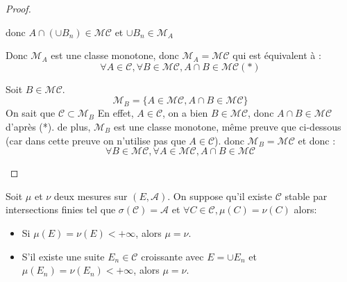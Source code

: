 \begin{proof}
\begin{itemize}
\begin{itemize}
\begin{itemize}
				                  donc $A \cap (\cup B_n) \in \mathscr{M}\mathscr{C}$ et $\cup B_n \in \mathscr{M}_A $
			            \end{itemize}

			            Donc $\mathscr{M}_A$ est une classe monotone, donc $\mathscr{M}_A = \mathscr{M}\mathscr{C}$ qui est équivalent à :
			            $$ \forall A \in \mathscr{C}, \forall B \in \mathscr{M}\mathscr{C}, A \cap B \in \mathscr{M}\mathscr{C} (*)$$

			            Soit $B\in \mathscr{M}\mathscr{C}$.
			            $$ \mathscr{M}_B = \{ A \in \mathscr{M}\mathscr{C}, A \cap B \in \mathscr{M}\mathscr{C}\} $$
			            On sait que $\mathscr{C}\subset\mathscr{M}_B$
			            En effet, $A \in \mathscr{C}$, on a bien $B \in \mathscr{M}\mathscr{C}$, donc $A\cap B \in\mathscr{M}\mathscr{C}$ d'après (*).
			            de plus, $\mathscr{M}_B$ est une classe monotone, même preuve que ci-dessous (car dans cette preuve on n'utilise pas que $A \in \mathscr{C}$).
			            donc $\mathscr{M}_B = \mathscr{M}\mathscr{C}$ et donc :
			            $$ \forall B \in \mathscr{M}\mathscr{C}, \forall A \in \mathscr{M}\mathscr{C}, A \cap B \in \mathscr{M}\mathscr{C}$$
		      \end{itemize}
	\end{itemize}
\end{proof}


\begin{theorem}
	Soit $\mu$ et $\nu$ deux mesures sur $(E,\mathscr{A})$. On suppose qu'il existe
	$\mathscr{C}$ stable par intersections finies tel que $\sigma(\mathscr{C}) = \mathscr{A}$
	et $\forall C \in \mathscr{C}, \mu(C) = \nu(C)$ alors:
	\begin{itemize}
		\item Si $\mu(E) = \nu (E) < +\infty$, alors $\mu = \nu$.
		\item S'il existe une suite $E_n\in \mathscr{C}$ croissante avec
		      $E = \cup E_n$ et $\mu(E_n) = \nu(E_n)< +\infty$, alors $\mu = \nu$.
	\end{itemize}
\end{theorem}

